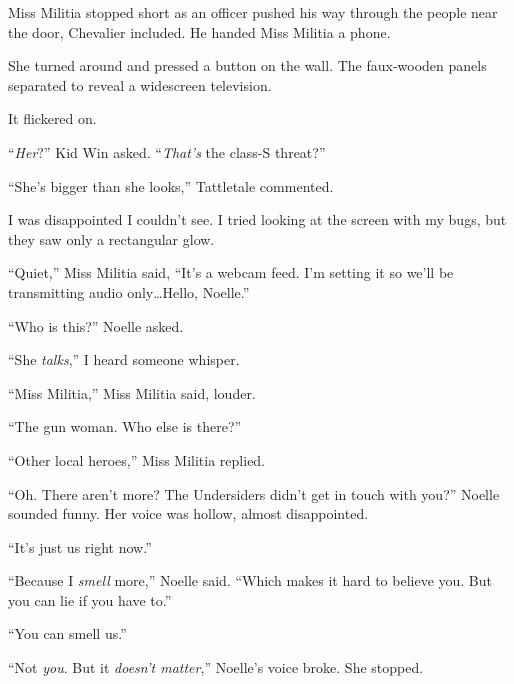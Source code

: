 Miss Militia stopped short as an officer pushed his way through the people near the door, Chevalier included.  He handed Miss Militia a phone.



She turned around and pressed a button on the wall.  The faux-wooden panels separated to reveal a widescreen television.



It flickered on.



``\emph{Her}?'' Kid Win asked.  ``\emph{That's} the class-S threat?''



``She's bigger than she looks,'' Tattletale commented.



I was disappointed I couldn't see.  I tried looking at the screen with my bugs, but they saw only a rectangular glow.



``Quiet,'' Miss Militia said, ``It's a webcam feed.  I'm setting it so we'll be transmitting audio only\ldots Hello, Noelle.''



``Who is this?''  Noelle asked.



``She \emph{talks},'' I heard someone whisper.



``Miss Militia,'' Miss Militia said, louder.



``The gun woman.  Who else is there?''



``Other local heroes,'' Miss Militia replied.



``Oh.  There aren't more?  The Undersiders didn't get in touch with you?''  Noelle sounded funny.  Her voice was hollow, almost disappointed.



``It's just us right now.''



``Because I \emph{smell} more,'' Noelle said.  ``Which makes it hard to believe you.  But you can lie if you have to.''



``You can smell us.''



``Not \emph{you}.  But it \emph{doesn't matter},'' Noelle's voice broke.  She stopped.



